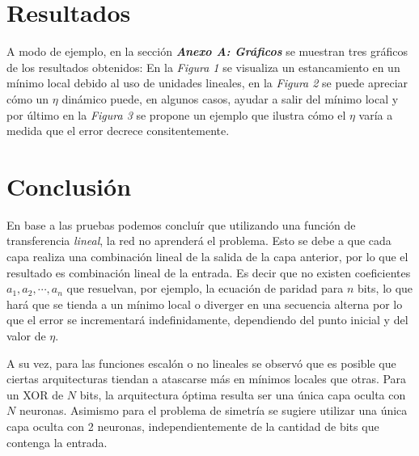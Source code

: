 \documentclass[%
    final,
    reprint,
    notitlepage,
    narroweqnarray,
    inline,
    twoside,
    invited
    ]{ieee}
\begin{document}
\section{Resultados}

\par A modo de ejemplo, en la sección \textit{\textbf{Anexo A: Gráficos}} se muestran tres gráficos de los resultados obtenidos: En la \textit{Figura 1} 
se visualiza un estancamiento en un mínimo local debido al uso de unidades lineales, en la \textit{Figura 2} se puede apreciar 
cómo un $\eta$ dinámico puede, en algunos casos, ayudar a salir del mínimo local y por último en la \textit{Figura 3} se propone un ejemplo 
que ilustra cómo el $\eta$ varía a medida que el error decrece consitentemente.


\section{Conclusión}

\par En base a las pruebas podemos concluír que utilizando una función de transferencia \textit{lineal}, la red no aprenderá el problema. 
Esto se debe a que cada capa realiza una combinación lineal de la salida de la capa anterior, por lo que el resultado es combinación lineal de la entrada. 
Es decir que no existen coeficientes $a_1, a_2, \cdots, a_n$ que resuelvan, por ejemplo, la ecuación de paridad para $n$ bits, 
lo que hará que se tienda a un mínimo local o diverger en una secuencia alterna por lo que el error se incrementará indefinidamente, dependiendo del 
punto inicial y del valor de $\eta$.

\par A su vez, para las funciones escalón o no lineales se observó que es posible que ciertas arquitecturas tiendan a atascarse más en mínimos 
locales que otras. Para un XOR de $N$ bits, la arquitectura óptima resulta ser una única capa oculta con $N$ neuronas. 
Asimismo para el problema de simetría se sugiere utilizar una única capa oculta con 2 neuronas, 
independientemente de la cantidad de bits que contenga la entrada.




\end{document}

